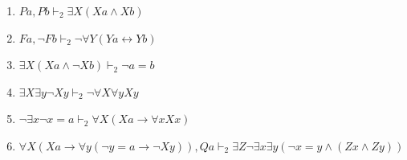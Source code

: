 \begin{enumerate}
    \item $ P a, P b \vdash_2 \exists X (X a \wedge X b) $
    \item $ F a, \neg F b \vdash_2 \neg \forall Y (Y a \leftrightarrow Y b) $
    \item $ \exists X (X a \wedge \neg X b) \vdash_2 \neg a = b $
    \item $ \exists X \exists y \neg X y \vdash_2 \neg \forall X \forall y X y $
    \item $ \neg \exists x \neg x = a \vdash_2 \forall X (X a \rightarrow \forall x X x) $
    \item $ \forall X (X a \rightarrow \forall y (\neg y = a \rightarrow \neg X y)), Q a \vdash_2 \exists Z \neg \exists x \exists y (\neg x = y \wedge (Z x \wedge Z y)) $
\end{enumerate}

\newpage
